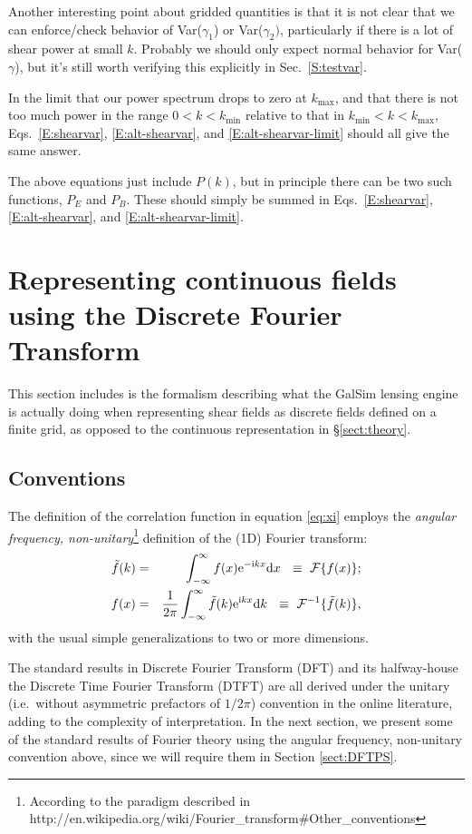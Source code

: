 \documentclass[preprint]{aastex}
\newcommand{\kmax}{\ensuremath{k_\mathrm{max}}}
\newcommand{\kmin}{\ensuremath{k_\mathrm{min}}}
\newcommand{\rmd}{\ensuremath{\mathrm{d}}}
\newcommand{\mi}{{\rm i}}
\newcommand{\me}{{\rm e}}
\begin{document}
Another interesting point about gridded quantities is that it is not
clear that we 
can enforce/check behavior of Var($\gamma_1$) or Var($\gamma_2)$,
particularly if 
there is a lot of shear power at small $k$.  Probably we should 
 only expect normal behavior for Var($\gamma$), but it's still worth
 verifying this explicitly in Sec.~\ref{S:testvar}.

In the limit that our power spectrum drops to zero at
\kmax, and that there is not too much power in the range $0<k<\kmin$
relative to that in $\kmin<k<\kmax$, Eqs.~\ref{E:shearvar}, \ref{E:alt-shearvar}, and
\ref{E:alt-shearvar-limit} should all give the same answer.

The above equations just include $P(k)$, but in principle there can be
two such functions, $P_{E}$ and $P_B$.  These should simply be summed
in Eqs.~\ref{E:shearvar}, \ref{E:alt-shearvar}, and
\ref{E:alt-shearvar-limit}.

\section{Representing continuous fields using the Discrete Fourier Transform}\label{S:discrete}

This section includes is the formalism describing what the GalSim
lensing engine is actually doing when representing shear fields as
discrete fields defined on a finite grid, as opposed to the continuous
representation in \S\ref{sect:theory}.

\subsection{Conventions}

The definition of the correlation function in equation \eqref{eq:xi}
employs the \emph{angular frequency, non-unitary}\footnote{According
  to the paradigm described in
  http://en.wikipedia.org/wiki/Fourier\_transform\#Other\_conventions}
definition of the (1D) Fourier transform:
\begin{eqnarray}
\tilde{f}(k) & = & \int_{-\infty}^{\infty} f(x) \me^{-\mi k x}
\rmd x ~ ~ \equiv ~ \mathcal{F} \{ f(x) \} \label{eq:fwdft} ; \\
f(x) & = & \frac{1}{2 \pi} \int_{-\infty}^{\infty} \tilde{f}(k) \me^{\mi k x}
\rmd k ~ ~ \equiv ~ \mathcal{F}^{-1}\{ \tilde{f}(k) \} \label{eq:invft}, 
\end{eqnarray}
with the usual simple generalizations to two or more dimensions.

The standard results in Discrete Fourier Transform (DFT) and its halfway-house the Discrete Time Fourier Transform (DTFT) are all derived under the unitary (i.e.\ without asymmetric prefactors of $1/2\pi$) convention in the online literature, adding to the complexity of interpretation.  In the next section, we present some of the standard results of Fourier theory using the angular frequency, non-unitary convention above, since we will require them in Section \ref{sect:DFTPS}.
\end{document}
